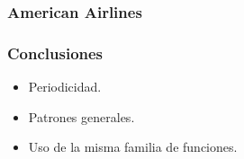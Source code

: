 \documentclass{beamer}
\begin{document}

\begin{frame}


\frametitle{American Airlines}


\end{frame}


\begin{frame}

\frametitle{Conclusiones}


\begin{itemize}
    \item{Periodicidad.}
    \item{Patrones generales.}
    \item{Uso de la misma familia de funciones.}
\end{itemize}


\end{frame}






\end{document}
